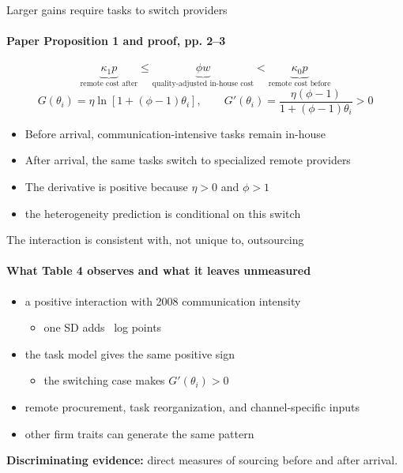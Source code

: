 \documentclass[11pt,aspectratio=169]{beamer}
\begin{document}
\begin{frame}[t]{Larger gains require tasks to switch providers}
  \hypertarget{app:modelderivation}{}%
  \framesubtitle{Paper Proposition 1 and proof, pp. 2--3}
  \medskip
  \[
    \underbrace{\kappa_1p}_{\text{remote cost after}}
      \leq
    \underbrace{\phi w}_{\text{quality-adjusted in-house cost}}
      <
    \underbrace{\kappa_0p}_{\text{remote cost before}}
  \]
  \[
    G(\theta_i)=\eta\ln[1+(\phi-1)\theta_i],
    \qquad
    G'(\theta_i)=\frac{\eta(\phi-1)}{1+(\phi-1)\theta_i}>0
  \]
  \begin{itemize}\setlength{\itemsep}{0.58em}
    \item Before arrival, communication-intensive tasks remain in-house
    \item After arrival, the same tasks switch to specialized remote providers
    \item The derivative is positive because $\eta>0$ and $\phi>1$
    \item {} the heterogeneity prediction is conditional on this switch
  \end{itemize}
\end{frame}

\begin{frame}{The interaction is consistent with, not unique to, outsourcing}
  \hypertarget{app:mechanism}{}%
  \framesubtitle{What Table 4 observes and what it leaves unmeasured}
  \medskip
  \begin{itemize}\setlength{\itemsep}{0.68em}
    \item {} a positive interaction with 2008 communication intensity
      \begin{itemize}
        \item one SD adds \ResCommSDGap\ log points
      \end{itemize}
    \item {} the task model gives the same positive sign
      \begin{itemize}
        \item the switching case makes $G'(\theta_i)>0$
      \end{itemize}
    \item {} remote procurement, task reorganization, and channel-specific inputs
    \item {} other firm traits can generate the same pattern
  \end{itemize}
  \bigskip
  \textbf{Discriminating evidence:} direct measures of sourcing before and after arrival.
\end{frame}
\end{document}
